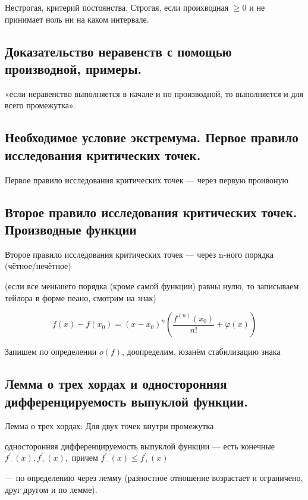 \documentclass[12pt, a4paper]{article}
\begin{document}
Нестрогая, критерий постоянства.
Строгая, если проихводная $\geqslant 0$ и не принимает ноль ни на каком интервале.

\subsection{Доказательство неравенств с помощью производной, примеры.}

«если неравенство выполняется в начале и по производной, то выполняется и для всего промежутка».


\subsection{Необходимое условие экстремума. Первое правило исследования критических точек.}


Первое правило исследования критических точек — через первую проивоную

\subsection{Второе правило исследования критических точек. Производные функции}

Второе правило исследования критических точек — через n-ного порядка (чётное/нечётное)

(если все меньшего порядка (кроме самой функции) равны нулю, то записываем тейлора в форме пеано, смотрим на знак)

\begin{equation*}
    f(x)-f\left(x_{0}\right)=\left(x-x_{0}\right)^{n}\left(\frac{f^{(n)}\left(x_{0}\right)}{n !}+\varphi(x)\right)
\end{equation*}

Запишем по определении $o(f)$, доопределим, юзанём стабилизацию знака


\subsection{Лемма о трех хордах и односторонняя дифференцируемость выпуклой функции.}

Лемма о трех хордах: Для двух точек внутри промежутка

односторонняя дифференцируемость выпуклой функции 
— есть конечные 
$f_{-}^{\prime}(x), f_{+}^{\prime}(x), \text { причем } f_{-}^{\prime}(x) \leqslant f_{+}^{\prime}(x)$ 

— по определению через лемму (разностное отношение возрастает и ограничено, друг другом и по лемме).
\end{document}
